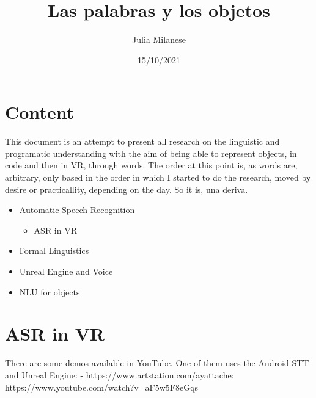 \documentclass[12pt]{article}
\title{Las palabras y los objetos}
\author{Julia Milanese}
\date{15/10/2021}
\begin{document}
\maketitle
\section{Content}
This document is an attempt to present all research on the linguistic and programatic understanding with the aim of being able to represent objects, in code and then in VR, through words.
The order at this point is, as words are, arbitrary, only based in the order in which I started to do the research, moved by desire or practicallity, depending on the day. So it is, una deriva.
\begin{itemize}
\item Automatic Speech Recognition
  \begin{itemize}
    \item ASR in VR
  \end{itemize} 
\item Formal Linguistics
\item Unreal Engine and Voice
\item NLU for objects
\end{itemize}


\newpage
\section{ASR in VR}
There are some demos available in YouTube. One of them uses the Android STT and Unreal Engine:
- https://www.artstation.com/ayattache: https://www.youtube.com/watch?v=aF5w5F8eGqs


\newpage
\end{document}
